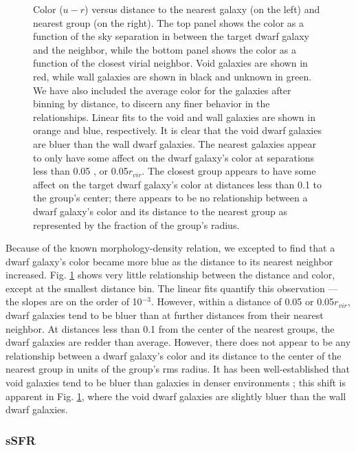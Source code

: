 \begin{figure}
    \caption[$u-r$ versus distance to nearest neighbor and group]{Color ($u-r$) 
    versus distance to the nearest galaxy (on the left) and nearest group (on 
    the right).  The top panel shows the color as a function of the sky 
    separation in \hMpc between the target dwarf galaxy and the neighbor, while 
    the bottom panel shows the color as a function of the closest virial 
    neighbor.  Void galaxies are shown in red, while wall galaxies are shown in 
    black and unknown in green.  We have also included the average color for the 
    galaxies after binning by distance, to discern any finer behavior in the 
    relationships.  Linear fits to the void and wall galaxies are shown in 
    orange and blue, respectively.  It is clear that the void dwarf galaxies are 
    bluer than the wall dwarf galaxies.  The nearest galaxies appear to only 
    have some affect on the dwarf galaxy's color at separations less than 0.05 
    \hMpc, or 0.05$r_{vir}$.  The closest group appears to have some 
    affect on the target dwarf galaxy's color at distances less than 0.1 \hMpc 
    to the group's center; there appears to be no relationship between a dwarf 
    galaxy's color and its distance to the nearest group as represented by the 
    fraction of the group's radius.}
    \label{fig:ur}
\end{figure}

Because of the known morphology-density relation, we excepted to find that a 
dwarf galaxy's color became more blue as the distance to its nearest neighbor 
increased.  Fig. \ref{fig:ur} shows very little relationship between the 
distance and color, except at the smallest distance bin.  The linear fits 
quantify this observation --- the slopes are on the order of 10$^{-3}$.  
However, within a distance of 0.05 \hMpc or 0.05$r_{vir}$, dwarf galaxies tend 
to be bluer than at further distances from their nearest neighbor.  At distances 
less than 0.1 \hMpc from the center of the nearest groups, the dwarf galaxies 
are redder than average.  However, there does not appear to be any relationship 
between a dwarf galaxy's color and its distance to the center of the nearest 
group in units of the group's rms radius.  It has been well-established that 
void galaxies tend to be bluer than galaxies in denser environments 
\citep{Grogin99,Rojas04,Patiri06,vonBendaBeckmann08,Hoyle12}; this shift is 
apparent in Fig. \ref{fig:ur}, where the void dwarf galaxies are slightly bluer 
than the wall dwarf galaxies.  


\subsubsection{sSFR}

